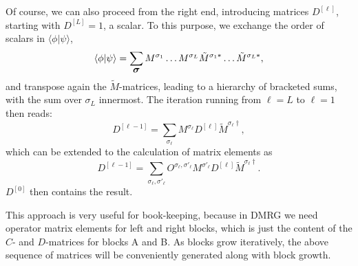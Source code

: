 \documentclass[a4paper,10pt,oneside,onecolumn,1p,times]{elsarticle}
\newcommand{\braket}[2]{\mbox{$\langle #1  | #2 \rangle$}} 	%
\newcommand{\fat}[1]{\mbox{\boldmath$#1$\unboldmath}}	%
\begin{document}
Of course, we can also proceed from the right end, introducing matrices $D^{[\ell]}$, starting with
$D^{[L]}=1$, a scalar. To this purpose, we exchange the order of scalars in $\braket{\phi}{\psi}$,
\begin{equation}
\braket{\phi}{\psi} = \sum_{\fat{\sigma}}M^{\sigma_1} \ldots M^{\sigma_L}  \tilde{M}^{\sigma_1*} \ldots \tilde{M}^{\sigma_L*}  ,
\end{equation}
and transpose again the $\tilde{M}$-matrices, leading to a hierarchy of bracketed sums, with the sum over $\sigma_L$ innermost. The iteration running from $\ell=L$ to $\ell=1$ then reads:
\begin{equation}
D^{[\ell-1]} = \sum_{\sigma_\ell}  M^{\sigma_{\ell}} D^{[\ell]} \tilde{M}^{\sigma_{\ell}\dagger} ,
\end{equation}
which can be extended to the calculation of matrix elements as
\begin{equation}
D^{[\ell-1]} = \sum_{\sigma_\ell,\sigma'_\ell}  O^{\sigma_\ell,\sigma'_\ell} M^{\sigma'_{\ell}} D^{[\ell]} \tilde{M}^{\sigma_{\ell}\dagger} .
\end{equation}
$D^{[0]}$ then contains the result.

This approach is very useful for book-keeping, because in DMRG we need operator matrix elements for left and right blocks, which is just the content of the $C$- and $D$-matrices for blocks A and B. As blocks grow iteratively, the above sequence of matrices will be conveniently generated along with block growth. 
\end{document}
